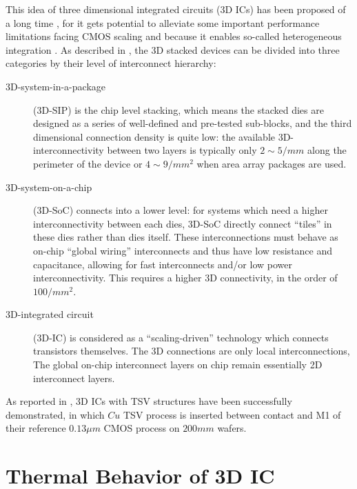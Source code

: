 This idea of three dimensional integrated circuits (3D ICs) has been proposed of a long time \cite{Beyne20043D},
for it gets potential to alleviate some important performance limitations facing CMOS scaling 
and because it enables so-called heterogeneous integration \cite{Beyne2006Rise}.
As described in \cite{Beyne20043D}, the 3D stacked devices can be divided into three categories
by their level of interconnect hierarchy:
\begin{description}
    \item[3D-system-in-a-package] (3D-SIP) is the chip level stacking, which means the stacked
    dies are designed as a series of well-defined and pre-tested sub-blocks, 
    and the third dimensional connection density is quite low: the available 3D-interconnectivity 
    between two layers is typically only $2\sim5/mm$ along the perimeter of the device or $4\sim9/mm^2$
    when area array packages are used.
    
    \item[3D-system-on-a-chip] (3D-SoC) connects into a lower level: for systems which need a higher
    interconnectivity between each dies, 3D-SoC directly connect ``tiles'' in these dies rather than dies
    itself. These interconnections must behave as on-chip ``global wiring'' interconnects and thus have low
    resistance and capacitance, allowing for fast interconnects and/or low power interconnectivity.
    This requires a higher 3D connectivity, in the order of $100/mm^2$.
    
    \item[3D-integrated circuit] (3D-IC) is considered as a ``scaling-driven'' technology 
    which connects transistors themselves. The 3D connections are only local interconnections,
    The global on-chip interconnect layers on chip remain essentially 2D interconnect layers.
\end{description}

As reported in \cite{Olmen20083D}, 3D ICs with TSV structures have been successfully demonstrated, 
in which $Cu$ TSV process is inserted between contact and M1 of their reference $0.13 \mu m$ CMOS process on
$200mm$ wafers. 

\section{Thermal Behavior of 3D IC}

